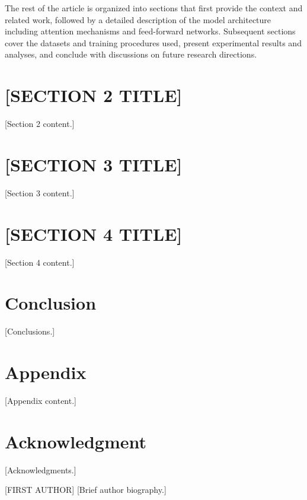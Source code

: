 \documentclass[journal]{IEEEtran}
\begin{document}
The rest of the article is organized into sections that first provide the context and related work, followed by a detailed description of the model architecture including attention mechanisms and feed-forward networks. Subsequent sections cover the datasets and training procedures used, present experimental results and analyses, and conclude with discussions on future research directions.


\section{[SECTION 2 TITLE]}
\label{sec:section2}

[Section 2 content.]


\section{[SECTION 3 TITLE]}
\label{sec:section3}

[Section 3 content.]


\section{[SECTION 4 TITLE]}
\label{sec:section4}

[Section 4 content.]


\section{Conclusion}
\label{sec:conclusion}

[Conclusions.]


\appendices
\section{Appendix}
[Appendix content.]


\section*{Acknowledgment}

[Acknowledgments.]




\begin{IEEEbiographynophoto}{[FIRST AUTHOR]}
[Brief author biography.]
\end{IEEEbiographynophoto}




\end{document}
